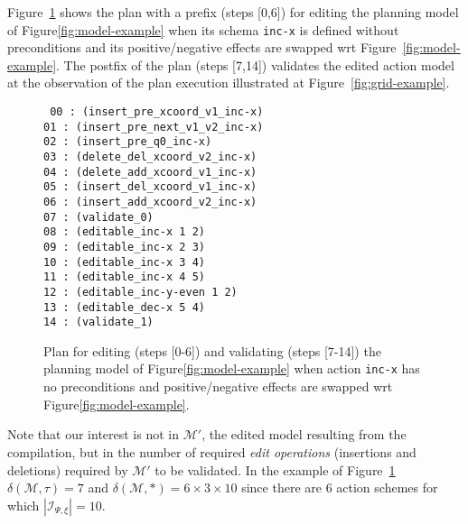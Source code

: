 \documentclass[letterpaper]{article} %
\begin{document}
Figure~\ref{fig:plan-pdistance} shows the plan with a prefix (steps [0,6]) for editing the planning model of Figure\ref{fig:model-example} when its schema {\tt\small inc-x} is defined without preconditions and its positive/negative effects are swapped wrt Figure~\ref{fig:model-example}. The postfix of the plan (steps [7,14]) validates the edited action model at the observation of the plan execution illustrated at Figure~\ref{fig:grid-example}. 
\begin{figure}
{\tt\scriptsize
00 : (insert\_pre\_xcoord\_v1\_inc-x)\\
01 : (insert\_pre\_next\_v1\_v2\_inc-x)\\
02 : (insert\_pre\_q0\_inc-x)\\
03 : (delete\_del\_xcoord\_v2\_inc-x)\\
04 : (delete\_add\_xcoord\_v1\_inc-x)\\
05 : (insert\_del\_xcoord\_v1\_inc-x)\\
06 : (insert\_add\_xcoord\_v2\_inc-x)\\
07 : (validate\_0)\\
08 : (editable\_inc-x 1 2)\\
09 : (editable\_inc-x 2 3)\\
10 : (editable\_inc-x 3 4)\\
11 : (editable\_inc-x 4 5)\\
12 : (editable\_inc-y-even 1 2)\\
13 : (editable\_dec-x 5 4)\\
14 : (validate\_1)
}
 \caption{\small Plan for editing (steps [0-6]) and validating (steps [7-14]) the planning model of Figure\ref{fig:model-example} when action {\tt\small inc-x} has no preconditions and positive/negative effects are swapped wrt Figure\ref{fig:model-example}.}
\label{fig:plan-pdistance}
\end{figure}

Note that our interest is not in $\mathcal{M}'$, the edited model resulting from the compilation, but in the number of required {\em edit operations} (insertions and deletions) required by $\mathcal{M}'$ to be validated. In the example of Figure~\ref{fig:plan-pdistance} $\delta(\mathcal{M},\tau)=7$ and $\delta(\mathcal{M},*)=6\times 3\times 10$ since there are 6 action schemes for which $|{\mathcal I}_{\Psi,\xi}|=10$.
\end{document}
